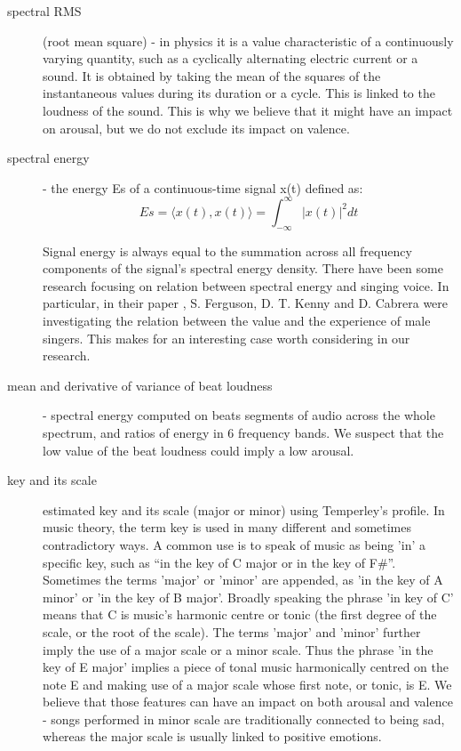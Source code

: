 \begin{description}
\item[spectral RMS] (root mean square) - in physics it is a value characteristic of a continuously varying quantity, such as a cyclically alternating electric current or a sound. It is obtained by taking the mean of the squares of the instantaneous values during its duration or a cycle. This is linked to the loudness of the sound. This is why we believe that it might have an impact on arousal, but we do not exclude its impact on valence.

\item[spectral energy] - the energy E{s} of a continuous-time signal x(t) defined as: 
\begin{equation}
E{s}  =  \langle x(t), x(t)\rangle =  \int_{-\infty}^{\infty}{|x(t)|^2}dt
\end{equation}

Signal energy is always equal to the summation across all frequency components of the signal's spectral energy density. 
There have been some research focusing on relation between spectral energy and singing voice. In particular, in their paper \cite{spectralenergy}, S. Ferguson, D. T. Kenny and D. Cabrera were investigating the relation between the value and the experience of male singers. This makes for an interesting case worth considering in our research.

\item[mean and derivative of variance of beat loudness] -  spectral energy computed on beats segments of audio across the whole spectrum, and ratios of energy in 6 frequency bands. We suspect that the low value of the beat loudness could imply a low arousal.

\item[key and its scale] estimated key and its scale (major or minor) using Temperley’s profile. 
In music theory, the term key is used in many different and sometimes contradictory ways. A common use is to speak of music as being 'in' a specific key, such as ``in the key of C major or in the key of F\#''. Sometimes the terms 'major' or 'minor' are appended, as 'in the key of A minor' or 'in the key of B major'.
Broadly speaking the phrase 'in key of C' means that C is music's harmonic centre or tonic (the first degree of the scale, or the root of the scale). 
The terms 'major' and 'minor' further imply the use of a major scale or a minor scale. Thus the phrase 'in the key of E major' implies a piece of tonal music harmonically centred on the note E and making use of a major scale whose first note, or tonic, is E. 
We believe that those features can have an impact on both arousal and valence - songs performed in minor scale are traditionally connected to being sad, whereas the major scale is usually linked to positive emotions.


\end{description}
